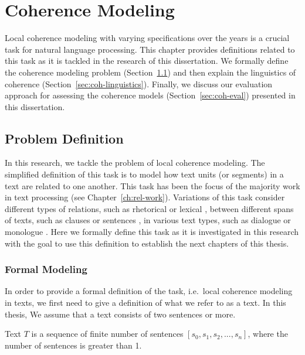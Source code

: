 
\chapter{Coherence Modeling}
\label{ch:coherence}

Local coherence modeling with varying specifications over the years is a crucial task for natural language processing. 
This chapter provides definitions related to this task as it is tackled in the research of this dissertation. 
We formally define the coherence modeling problem (Section~\ref{sec:coh-def}) and then explain the linguistics of coherence (Section~\ref{sec:coh-linguistics}). 
Finally, we discuss our evaluation approach for assessing the coherence models (Section~\ref{sec:coh-eval}) presented in this dissertation.   


\section{Problem Definition}
\label{sec:coh-def}

In this research, we tackle the problem of local coherence modeling. 
The simplified definition of this task is to model how text units (or segments) in a text are related to one another. 
This task has been the focus of the majority work in text processing (see Chapter~\ref{ch:rel-work}). 
Variations of this task consider different types of relations, such as rhetorical \cite{hovyeduard89} or lexical \cite{morris91}, between different spans of texts, such as clauses \cite{strube.col98} or sentences \cite{halliday76}, in various text types, such as dialogue \cite{wangxinhao13} or monologue \cite{barzilay08}. 
Here we formally define this task as it is investigated in this research with the goal to use this definition to establish the next chapters of this thesis. 

\subsection{Formal Modeling}

In order to provide a formal definition of the task, i.e.\ local coherence modeling in texts, we first need to give a definition of what we refer to as a text. 
In this thesis, 
We assume that a text consists of two sentences or more.  

\begin{definition}
Text $T$ is a sequence of finite number of sentences $[s_0, s_1, s_2, ..., s_n]$, where the number of sentences is greater than 1.   
\end{definition}

